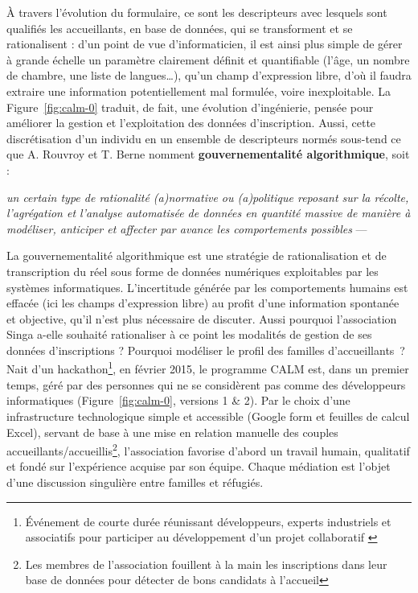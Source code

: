 \documentclass[symmetric,justified,marginals=raggedouter]{tufte-book}
\begin{document}
À travers l'évolution du formulaire, ce sont les descripteurs avec lesquels sont qualifiés les accueillants, en base de données, qui se transforment et se rationalisent : d'un point de vue d'informaticien, il est ainsi plus simple de gérer à grande échelle un paramètre clairement définit et quantifiable (l'âge, un nombre de chambre, une liste de langues\ldots{}), qu'un champ d'expression libre, d'où il faudra extraire une information potentiellement mal formulée, voire inexploitable. La Figure~\ref{fig:calm-0} traduit, de fait, une évolution d'ingénierie, pensée pour améliorer la gestion et l'exploitation des données d'inscription. Aussi, cette discrétisation d'un individu en un ensemble de descripteurs normés sous-tend ce que A. Rouvroy et T. Berne nomment \textbf{gouvernementalité algorithmique}, soit :\\

\begin{fullwidth}
\og\textit{un certain type de rationalité (a)normative ou (a)politique reposant sur la récolte, l’agrégation et l’analyse automatisée de données en quantité massive de manière à modéliser, anticiper et affecter par avance les comportements possibles}\fg{} --- \citep[p.11]{rouvroy_gouvernementalite_2013}\\
\end{fullwidth}

\noindent La gouvernementalité algorithmique est une stratégie de rationalisation et de transcription du réel sous forme de données numériques exploitables par les systèmes informatiques. L'incertitude générée par les comportements humains est effacée (ici les champs d'expression libre) au profit d'une information spontanée et objective, qu'il n'est plus nécessaire de discuter. Aussi pourquoi l'association Singa a-elle souhaité rationaliser à ce point les modalités de gestion de ses données d'inscriptions ? Pourquoi modéliser le profil des familles d'accueillants~?\\

\noindent Nait d'un hackathon\footnote{\RaggedOuter Événement de courte durée réunissant développeurs, experts industriels et associatifs pour participer au développement d'un projet collaboratif \citep{lobbe_concevoir_2018}}, en février 2015, le programme CALM est, dans un premier temps, géré par des personnes qui ne se considèrent pas comme des développeurs informatiques (Figure~\ref{fig:calm-0}, versions 1 \& 2). Par le choix d'une infrastructure technologique simple et accessible (Google form et feuilles de calcul Excel), servant de base à une mise en relation manuelle des couples accueillants/accueillis\footnote{\RaggedOuter Les membres de l'association fouillent à la main les inscriptions dans leur base de données pour détecter de bons candidats à l'accueil}, l'association favorise d'abord un travail humain, qualitatif et fondé sur l'expérience acquise par son équipe. Chaque médiation est l'objet d'une discussion singulière entre familles et réfugiés.
\end{document}
